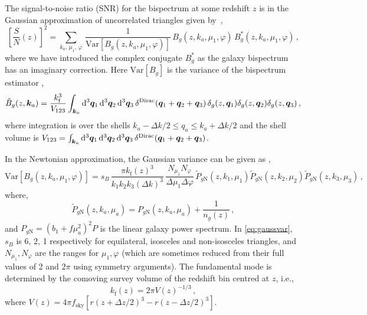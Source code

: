 The signal-to-noise ratio (SNR) for the bispectrum at some redshift $z$ is in the Gaussian approximation of uncorrelated triangles given by~\citep{Scoccimarro:2003wn}, 
\begin{equation}
\left[\frac{S}{N}(z)\right]^{2} = 
\sum_{k_a,\,\mu_{1},\,\varphi}\,\frac{1}{{\mathrm{Var}} [{B_{g}}(z, k_a,\mu_{1},\varphi)]}
\,B_{g}(z, k_{a},  \mu_{1},\varphi)\,B^*_{g}(z, k_a, \mu_{1},\varphi)\,,\label{eq:snrdef} 
\end{equation} 
where we have introduced the complex conjugate $B^*_g$ as the galaxy bispectrum has an imaginary correction. Here ${\mathrm{Var}} [{B_{g}}]$ is the variance of the bispectrum estimator \citep{Chan:2016ehg},
\begin{equation} \label{hatb}
\hat{B}_g(z,\bm{k}_a) = \frac{k_{\mathrm{f}}^3}{V_{123}}\int_{\bm{k}_a}\mathrm{d}^3\bm{q}_1\, \mathrm{d}^3\bm{q}_2 \,\mathrm{d}^3\bm{q}_3\,\delta^{{\mathrm{Dirac}}}(\bm{q}_1+\bm{q}_2+\bm{q}_3)\, \delta_g(z,\bm{q}_1) \delta_g(z,\bm{q}_2) \delta_g(z,\bm{q}_3) \,,
\end{equation}
where integration is over the shells $k_a-\Delta k/2\leq q_a \leq k_a+\Delta k/2$ and  the shell volume is
$V_{123}=\int_{\bm{k}_a}\mathrm{d}^3\bm{q}_1\, \mathrm{d}^3\bm{q}_2 \,\mathrm{d}^3\bm{q}_3\,\delta^{{\mathrm{Dirac}}}(\bm{q}_1+\bm{q}_2+\bm{q}_3)$.


In the Newtonian approximation, the Gaussian variance can be given as \citep{Scoccimarro:2003wn, Karagiannis:2018jdt},
\begin{equation}
\mathrm{Var} [{B_{g}}(z, k_a,\mu_{1},\varphi)] = s_B\, \frac{\pi k_{\mathrm{f}}(z)^3}{k_1k_2k_3 (\Delta k)^3}\,\frac{N_{\mu_1}N_\varphi}{\Delta \mu_1 \Delta \varphi} \, \tilde{P}_{g{\mathrm{N}}}(z,k_{1},\mu_{1}) \tilde{P}_{g{\mathrm{N}}}(z,k_{2},\mu_{2})\tilde{P}_{g{\mathrm{N}}}(z,k_{3},\mu_{3})\,,
\label{eq:gaussvar} 
\end{equation}
where,
\begin{equation}
\tilde{P}_{g{\mathrm{N}}}(z, k_{a}, \mu_{a}) = P_{g{\mathrm{N}}}(z, k_{a}, \mu_{a}) + \frac{1}{n_g(z)}\,, \label{eq:Pgdef} 
\end{equation}
and ${P}_{g{\mathrm{N}}}=(b_1+f\mu_a^2)^2P$ is the linear galaxy power spectrum.
In \eqref{eq:gaussvar}, $s_{B}$ is 6, 2, 1 respectively for equilateral, isosceles and non-isosceles triangles, and $N_{\mu_1},N_\varphi$ are the ranges for $\mu_1,  \varphi $ (which are sometimes reduced from their full values of 2 and $2\pi$ using symmetry arguments).
The fundamental mode is determined by the comoving survey volume of the redshift bin centred at $z$, i.e.,
\begin{equation}\label{eq:kfundamental}
    k_{\mathrm{f}}(z) = {2\pi}{V(z)^{-1/3}}\,,
\end{equation}
where $V(z)=4\pi  f_{\mathrm{sky}}[r(z+\Delta z/2)^3 - r(z-\Delta z/2)^3]$.

